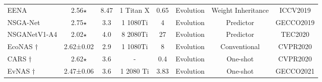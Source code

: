 \documentclass[sigconf]{acmart}
\begin{document}
\begin{table*}[!th]
\begin{tabular}{l|c|c|c|c|c|c|c}
EENA \cite{Ref:51}                               & 2.56$\star$                                                                                   & 8.47                                                           & 1 Titan X                          & 0.65                                                                      & Evolution                                  & Weight Inheritance         &ICCV2019                          \\
NSGA-Net \cite{Ref:61}                               & 2.75$\star$                                                                                   & 3.3                                                           & 1 1080Ti                          & 4                                                                      & Evolution                                  & Predictor         &GECCO2019                          \\
NSGANetV1-A4 \cite{Ref:61}                               & 2.02$\star$                                                                                   & 4.0                                                           & 8 2080Ti                          & 27                                                                      & Evolution                                  & Predictor         &TEC2020                          \\
EcoNAS \cite{Ref:58}$\dagger$                                       & 2.62±0.02                                                                                      & 2.9                                                           & 1 1080Ti                                & 8                                                                       & Evolution                                  & Conventional  &CVPR2020                                     \\

CARS \cite{Ref:07}$\dagger$                                       & 2.62$\star$                                                                                       & 3.6                                                           & -                                & 0.4                                                                       & Evolution                                  & One-shot       &CVPR2020 \\
EvNAS \cite{Ref:62}$\dagger$                                       & 2.47±0.06                                                                                     & 3.6                                                           & 1 2080 Ti                                & 3.83                                                                       & Evolution                                  & One-shot       &GECCO2021 \\\hline


\end{tabular}
\end{table*}
\end{document}
